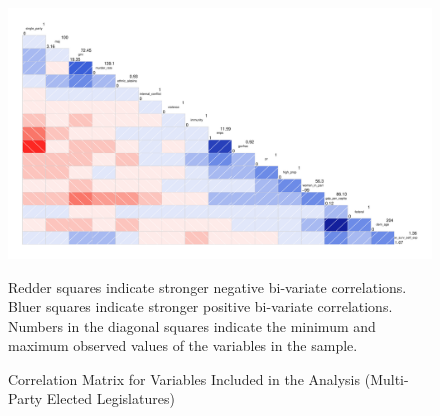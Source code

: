 \documentclass[a4paper]{article}\usepackage[]{graphicx}\usepackage[]{color}
\begin{document}
\begin{landscape}
\begin{figure}[t]
    \caption{Correlation Matrix for Variables Included in the Analysis (Multi-Party Elected Legislatures)}
    \label{corrmatrix}
    \begin{center}

    \includegraphics[scale=0.5]{corrScatter.pdf}

    \end{center}
    \begin{singlespace}
        {\scriptsize{Redder squares indicate stronger negative bi-variate correlations. \\
        Bluer squares indicate stronger positive bi-variate correlations. \\
        Numbers in the diagonal squares indicate the minimum and maximum observed values of the variables in the sample.
        }}
    \end{singlespace}
\end{figure}
\end{landscape}




\end{document}
